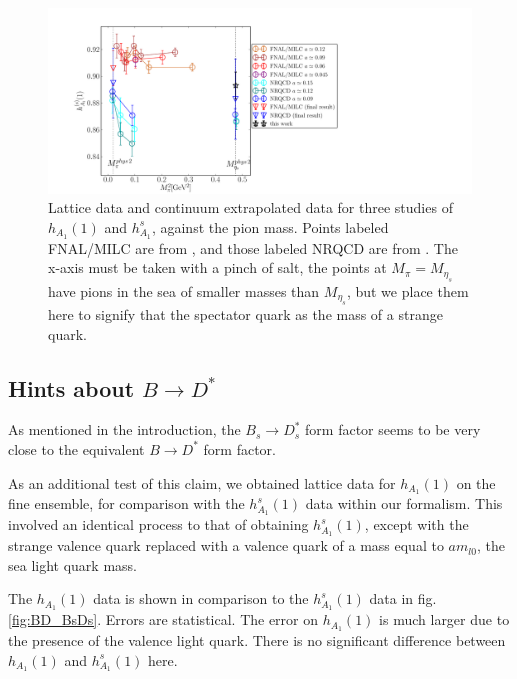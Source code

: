 \begin{figure}[htb!]
  \vspace{-20pt}
  \begin{center}
  \includegraphics[width=1.2\textwidth]{images/BsDsstar/fermilab_nrqcd_data.pdf}
  \caption{Lattice data and continuum extrapolated data for three studies of $h_{A_1}(1)$ and $h_{A_1}^s$, against the pion mass. Points labeled FNAL/MILC are from \cite{Bailey:2014tva}, and those labeled NRQCD are from \cite{Harrison:2017fmw}. The x-axis must be taken with a pinch of salt, the points at $M_{\pi}=M_{\eta_s}$ have pions in the sea of smaller masses than $M_{\eta_s}$, but we place them here to signify that the spectator quark as the mass of a strange quark. \label{fig:fermilab_data}}
  \end{center}
  \vspace{-20pt}
\end{figure}

\subsection{Hints about $B\to D^*$}

As mentioned in the introduction, the $B_s\to D_s^*$ form factor seems to be very close to the equivalent $B\to D^*$ form factor. 

As an additional test of this claim, we obtained lattice data for $h_{A_1}(1)$ on the fine ensemble, for comparison with the $h_{A_1}^s(1)$ data within our formalism. This involved an identical process to that of obtaining $h_{A_1}^s(1)$, except with the strange valence quark replaced with a valence quark of a mass equal to $am_{l0}$, the sea light quark mass.

The $h_{A_1}(1)$ data is shown in comparison to the $h_{A_1}^s(1)$ data in fig. \ref{fig:BD_BsDs}. Errors are statistical. The error on $h_{A_1}(1)$ is much larger due to the presence of the valence light quark. There is no significant difference between $h_{A_1}(1)$ and $h_{A_1}^s(1)$ here.

